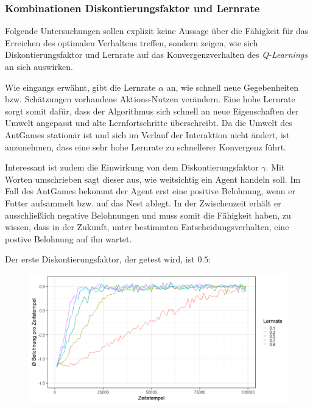 \subsubsection*{Kombinationen Diskontierungsfaktor und Lernrate}
Folgende Untersuchungen sollen explizit keine Aussage über die Fähigkeit für das Erreichen des optimalen Verhaltens treffen, sondern zeigen, wie sich Diskontierungsfaktor und Lernrate auf das Konvergenzverhalten des \textit{Q-Learnings} an sich auswirken.
\par 
Wie eingangs erwähnt, gibt die Lernrate $\alpha$ an, wie schnell neue Gegebenheiten bzw. Schätzungen vorhandene Aktions-Nutzen verändern. Eine hohe Lernrate sorgt somit dafür, dass der Algorithmus sich schnell an neue Eigenschaften der Umwelt angepasst und alte Lernfortschritte überschreibt. Da die Umwelt des AntGames stationär ist und sich im Verlauf der Interaktion nicht ändert, ist anzunehmen, dass eine sehr hohe Lernrate zu schnellerer Konvergenz führt.
\par 
Interessant ist zudem die Einwirkung von dem Diskontierungsfaktor $\gamma$. Mit Worten umschrieben sagt dieser aus, wie \glqq weitsichtig\grqq{} ein Agent handeln soll. Im Fall des AntGames bekommt der Agent erst eine positive Belohnung, wenn er Futter aufsammelt bzw. auf das Nest ablegt. In der Zwischenzeit erhält er ausschließlich negative Belohnungen und muss somit die Fähigkeit haben, zu wissen, dass in der Zukunft, unter bestimmten Entscheidungsverhalten, eine postive Belohnung auf ihn wartet. 
\par 
Der erste Diskontierungsfaktor, der getest wird, ist $0.5$:
\begin{figure}[H]
    \centering
    \includegraphics[width=\textwidth]{images/antGameAnalysis05DiscA}
    \label{fig:test1}
\end{figure}
